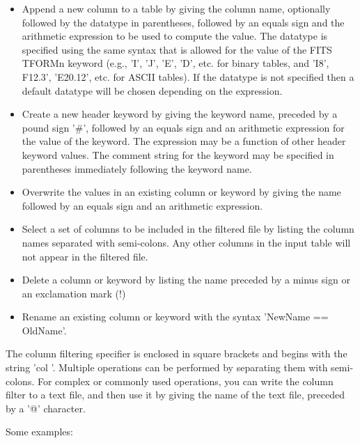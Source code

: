 \documentclass[11pt]{article}
\begin{document}
\begin{itemize}
\item
Append a new column to a table by giving the column name, optionally
followed by the datatype in parentheses, followed by an equals sign and
the arithmetic  expression to be used to compute the value.  The
datatype is specified using the same syntax that is allowed for the
value of the FITS TFORMn keyword (e.g., 'I', 'J', 'E', 'D', etc. for
binary tables, and 'I8', F12.3', 'E20.12', etc.  for ASCII tables).  If
the datatype is not specified then a default datatype will be chosen
depending on the expression.

\item
Create a new header keyword by giving the keyword name, preceded by a
pound sign '\#', followed by an equals sign and an arithmetic
expression for the value of the keyword.  The expression may be a
function of other header keyword values.  The comment string for the
keyword may be specified in parentheses immediately following the
keyword name.

\item
Overwrite the values in an existing column or keyword by giving the
name followed by an equals sign and an arithmetic expression.

\item
Select a set of columns to be included in the filtered file by
listing the column names separated with semi-colons.  Any other
columns in the input table will not appear in the filtered file.

\item
Delete a column or keyword by listing the name preceded by a minus sign
or an exclamation mark (!)

\item
Rename an existing column or keyword with the syntax 'NewName ==
OldName'.

\end{itemize}

The column filtering specifier is enclosed in square brackets and
begins with the string 'col '.   Multiple operations can be performed
by separating them with semi-colons.  For  complex  or commonly used
operations,  you can write the column filter to a text file, and then
use it by giving the name of the text file, preceded by a '@'
character.

Some examples:
\end{document}
